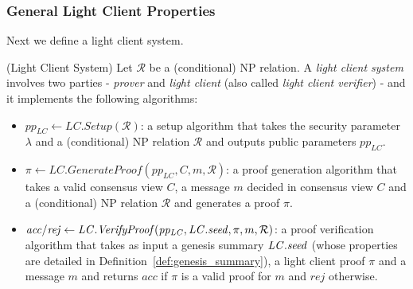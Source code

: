 \subsubsection{General Light Client Properties}

\noindent Next we define a light client system. 
\label{sec:soundness}
  
\begin{definition}(Light Client System)
\label{scheme_light_client} Let $\mathcal{R}$ be a (conditional) NP relation. A \emph{light client system} involves 
two parties - \emph{prover} and \emph{light client} (also called \emph{light client verifier}) - and it implements the following algorithms:
\begin{itemize}
\item $\mathit{pp_{\mathit{LC}}} \leftarrow \mathit{LC.Setup}(\mathcal{R})$: 
a setup algorithm that takes the security parameter $\lambda$ and a (conditional) NP relation $\mathcal{R}$ 
and outputs public parameters $\mathit{pp_{\mathit{LC}}}$.
\item $\pi \leftarrow \mathit{LC.GenerateProof}(\mathit{pp_{\mathit{LC}}}, C, m, \mathcal{R})$: a proof 
generation algorithm that takes a valid consensus view $C$, a message $m$ decided in consensus view $C$ 
and a (conditional) NP relation $\mathcal{R}$ and generates a proof $\pi$.
\item $\mathit{acc}/\mathit{rej}  \leftarrow  \mathit{LC.VerifyProof}(\mathit{pp_{\mathit{LC}}}, \mathit{LC.seed}, \pi, m, \mathcal{R})$: 
a proof verification algorithm that takes as input a genesis summary $\mathit{LC.seed}$ (whose properties are detailed in 
Definition~\ref{def:genesis_summary}), a light client proof $\pi$ and a message $m$ and returns $\mathit{acc}$ if $\pi$ is a valid 
proof for $m$ and $\mathit{rej}$ otherwise.
\end{itemize}


\end{definition}
